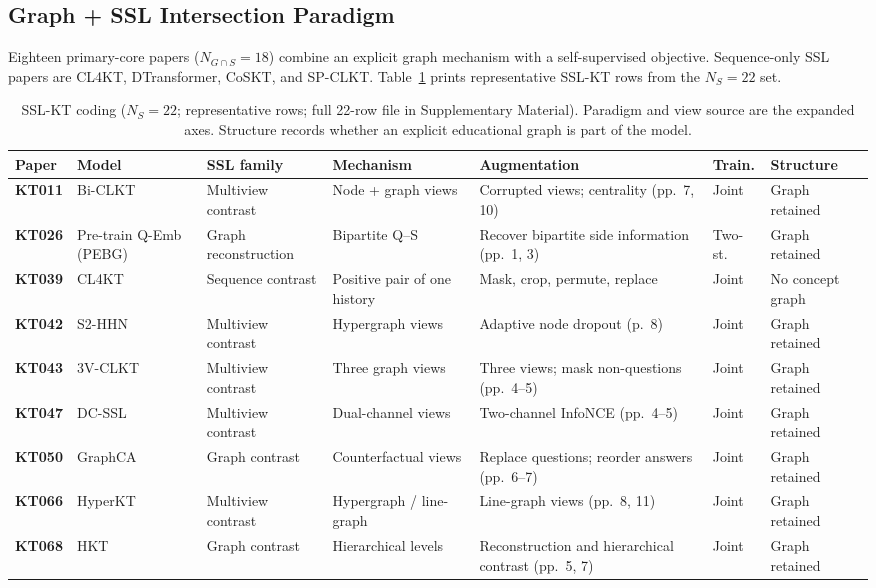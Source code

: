\documentclass[lettersize,journal]{IEEEtran}
\begin{document}
\subsection{Graph + SSL Intersection Paradigm}
Eighteen primary-core papers ($N_{G \cap S} = 18$) combine an explicit graph mechanism with a self-supervised objective. Sequence-only SSL papers are CL4KT, DTransformer, CoSKT, and SP-CLKT. Table~\ref{tab:ssl_taxonomy} prints representative SSL-KT rows from the $N_S=22$ set.
\begin{table}[t]
\caption{SSL-KT coding ($N_S=22$; representative rows; full 22-row file in Supplementary Material). Paradigm and view source are the expanded axes. Structure records whether an explicit educational graph is part of the model.}
\label{tab:ssl_taxonomy}
\centering
\footnotesize
\setlength{\tabcolsep}{3.0pt}
\begin{tabular}{@{}l>{\raggedright\arraybackslash}p{2.15cm}>{\raggedright\arraybackslash}p{1.85cm}>{\raggedright\arraybackslash}p{1.85cm}>{\raggedright\arraybackslash}p{2.05cm}l>{\raggedright\arraybackslash}p{1.45cm}@{}}
\toprule
\textbf{Paper} & \textbf{Model} & \textbf{SSL family} & \textbf{Mechanism} & \textbf{Augmentation} & \textbf{Train.} & \textbf{Structure} \\
\midrule
\textbf{KT011} & Bi-CLKT \cite{KT011_BiCLKT_2022} & Multiview contrast & Node + graph views & Corrupted views; centrality (pp.~7, 10) & Joint & Graph retained \\
\textbf{KT026} & Pre-train Q-Emb (PEBG) \cite{KT026_PretrainQ_2020} & Graph reconstruction & Bipartite Q--S & Recover bipartite side information (pp.~1, 3) & Two-st. & Graph retained \\
\textbf{KT039} & CL4KT \cite{KT039_CL4KT_2022} & Sequence contrast & Positive pair of one history & Mask, crop, permute, replace & Joint & No concept graph \\
\textbf{KT042} & S2-HHN \cite{KT042_S2HHN_2023} & Multiview contrast & Hypergraph views & Adaptive node dropout (p.~8) & Joint & Graph retained \\
\textbf{KT043} & 3V-CLKT \cite{KT043_3VCLKT_2024} & Multiview contrast & Three graph views & Three views; mask non-questions (pp.~4--5) & Joint & Graph retained \\
\textbf{KT047} & DC-SSL \cite{KT047_DCSSL_2023} & Multiview contrast & Dual-channel views & Two-channel InfoNCE (pp.~4--5) & Joint & Graph retained \\
\textbf{KT050} & GraphCA \cite{KT050_GraphCA_2023} & Graph contrast & Counterfactual views & Replace questions; reorder answers (pp.~6--7) & Joint & Graph retained \\
\textbf{KT066} & HyperKT \cite{KT066_HyperKT_2025} & Multiview contrast & Hypergraph / line-graph & Line-graph views (pp.~8, 11) & Joint & Graph retained \\
\textbf{KT068} & HKT \cite{KT068_HKT_2025} & Graph contrast & Hierarchical levels & Reconstruction and hierarchical contrast (pp.~5, 7) & Joint & Graph retained \\
\bottomrule
\end{tabular}
\end{table}
\end{document}
